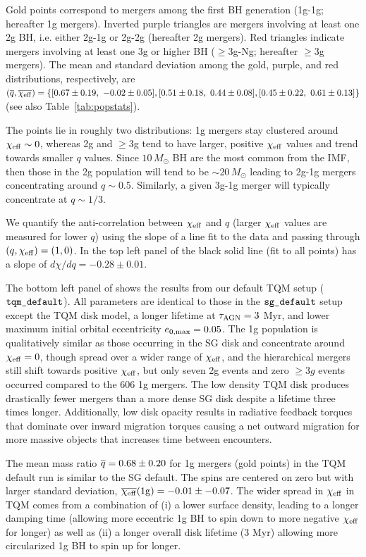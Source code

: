 Gold points correspond to mergers among the first BH generation (1g-1g; hereafter 1g mergers).
Inverted purple triangles are mergers involving at least one 2g BH, i.e. either 2g-1g or 2g-2g (hereafter 2g mergers).
Red triangles indicate mergers involving at least one 3g or higher BH ($\geq$3g-Ng; hereafter $\geq$3g mergers).
The mean and standard deviation among the gold, purple, and red distributions, respectively, are $(\overline{q},\overline{\chi_{\rm eff}})=\{[0.67\pm 0.19,\ -0.02\pm 0.05], [0.51\pm 0.18,\ 0.44\pm 0.08], [0.45\pm 0.22,\ 0.61\pm 0.13]\}$ (see also Table~\ref{tab:popstats}).

The points lie in roughly two distributions: 1g mergers stay clustered around $\chi_{\rm eff} \sim 0$, whereas 2g and $\geq$3g tend to have larger, positive $\chi_{\rm eff}$ values and trend towards smaller $q$ values.
Since $10\,M_{\odot}$ BH are the most common from the IMF, then those in the 2g population will tend to be $\sim 20\,M_{\odot}$ leading to 2g-1g mergers concentrating around $q \sim 0.5$.
Similarly, a given 3g-1g merger will typically concentrate at $q \sim 1/3$.

We quantify the anti-correlation between $\chi_{\rm eff}$ and $q$ (larger $\chi_{\rm eff}$ values are measured for lower $q$) using the slope of a line fit to the data and passing through $(q,\chi_{\rm eff})=(1,0)$.
In the top left panel of  the black solid line (fit to all points) has a slope of $d\chi/dq=-0.28\pm0.01$.

The bottom left panel of  shows the results from our default TQM setup ($\tqmdefault$).
All parameters are identical to those in the $\sgdefault$ setup except the TQM disk model, a longer lifetime at $\tau_{\rm AGN}=3$ Myr, and lower maximum initial orbital eccentricity $e_{\rm 0,max}=0.05$.
The 1g population is qualitatively similar as those occurring in the SG disk and concentrate around $\chi_{\rm eff}=0$, though spread over a wider range of $\chi_{\rm eff}$, and the hierarchical mergers still shift towards positive $\chi_{\rm eff}$, but only seven 2g events and zero $\geq3g$ events occurred compared to the 606 1g mergers.
The low density TQM disk produces drastically fewer mergers than a more dense SG disk despite a lifetime three times longer.
Additionally, low disk opacity results in radiative feedback torques \citep{HanklaJiangArmitage20} that dominate over inward migration torques causing a net outward migration for more massive objects that increases time between encounters.

The mean mass ratio $\overline{q}=0.68\pm0.20$ for 1g mergers (gold points) in the TQM default run is similar to the SG default.
The spins are centered on zero but with larger standard deviation, $\overline{\chi_{\rm eff}}({\rm 1g})=-0.01\pm-0.07$.
The wider spread in $\chi_{\rm eff}$ in TQM comes from a combination of (i) a lower surface density, leading to a longer damping time (allowing more eccentric 1g BH to spin down to more negative $\chi_{\rm eff}$ for longer) as well as (ii) a longer overall disk lifetime (3 Myr) allowing more circularized 1g BH to spin up for longer.


